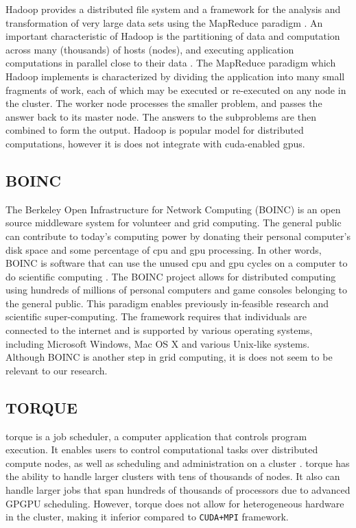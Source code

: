 Hadoop provides a distributed file system and a framework
for the analysis and transformation of very large data sets using the MapReduce
paradigm \cite{website:Apache-Hadoop} \cite{website:Apress} \cite{dias2011hpc}
\cite{dean2001mapreduce}. An important characteristic of Hadoop is the
partitioning of data and computation across many (thousands) of hosts (nodes),
and executing application computations in parallel close to their data
\cite{shvachko2011apache}. The MapReduce \cite{luo2011hierarchical}
\cite{website:Hadoop-Wiki-map} paradigm which Hadoop implements is
characterized by dividing the application into many small fragments of work,
each of which may be executed or re-executed on any node in the cluster. The
worker node processes the smaller problem, and passes the answer back to its
master node. The answers to the subproblems are then combined to form the
output. Hadoop is popular model for distributed computations, however it is
does not integrate with \gls{cuda}-enabled \glspl{gpu}.

\subsection{BOINC}

The Berkeley Open Infrastructure for Network Computing (BOINC) is an open
source middleware system for volunteer and grid computing. The general public
can contribute to today's computing power by donating their personal computer's
disk space and some percentage of \gls{cpu} and \gls{gpu} processing. In other
words, BOINC is software that can use the unused \gls{cpu} and \gls{gpu} cycles
on a computer to do scientific computing \cite{anderson2004boinc}. The BOINC
project allows for distributed computing using hundreds of millions of personal
computers and game consoles belonging to the general public. This paradigm
enables previously in-feasible research and scientific super-computing. The
framework requires that individuals are connected to the internet and is
supported by various operating systems, including Microsoft Windows, Mac OS X
and various Unix-like systems. Although BOINC is another step in grid
computing, it is does not seem to be relevant to our research.

\subsection{TORQUE}

\Gls{torque} is a job scheduler, a computer application that controls program
execution. It enables users to control computational tasks over distributed
compute nodes, as well as scheduling and administration on a cluster
\cite{website:TORQUE-Resource-Manager}. \Gls{torque} has the ability to handle
larger clusters with tens of thousands of nodes. It also can handle larger jobs
that span hundreds of thousands of processors due to advanced GPGPU scheduling.
However, \Gls{torque} does not allow for heterogeneous hardware in the cluster,
making it inferior compared to \texttt{CUDA+MPI} framework.

